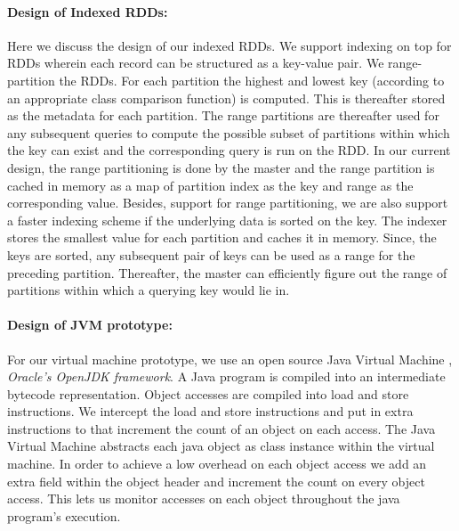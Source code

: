 \paragraph{Design of Indexed RDDs:}
Here we discuss the design of our indexed RDDs. We support indexing on top for RDDs wherein each record can be structured as a key-value pair. We range-partition the RDDs. For each partition the highest and lowest key (according to an appropriate class comparison function) is computed. This is thereafter stored as the metadata for each partition. The range partitions are thereafter used for any subsequent queries to compute the possible subset of partitions within which the key can exist and the corresponding query is run on the RDD. In our current design, the range partitioning is done by the master and the range partition is cached in memory as a map of partition index as the key and range as the corresponding value.  
Besides, support for range partitioning, we are also support a faster indexing scheme if the underlying data is sorted on the key. The indexer stores the smallest value for each partition and caches it in memory. Since, the keys are sorted, any subsequent pair of keys can be used as a range for the preceding partition. Thereafter, the master can efficiently figure out the range of partitions within which a querying key would lie in. 

\paragraph{Design of JVM prototype:}
For our virtual machine prototype, we use an open source Java Virtual Machine \cite{openjdk}, \textit{Oracle's OpenJDK framework}. A Java program is compiled into an intermediate bytecode representation. Object accesses are compiled into load and store instructions. We intercept the load and store instructions and put in extra instructions to that increment the count of an object on each access.  The Java Virtual Machine abstracts each java object as class instance within the virtual machine.  In order to achieve a low overhead on each object access we add an extra field within the object header and increment the count on every object access. This lets us monitor accesses on each object throughout the java program's execution.


